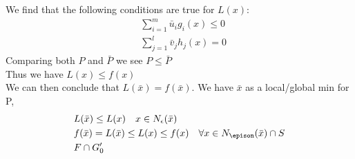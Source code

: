 \documentclass[12pt]{article}
\begin{document}
We find that the following conditions are true for $L(x)$: \\
    \begin{align*}
        &\sum_{i=1}^{m} \bar u_i g_i(x) \leq 0 \\
        &\sum_{j=1}^{l} \bar v_j h_j(x) = 0
    \end{align*}
Comparing both $P$ and $\bar P$ we see $P \leq  \bar P$\\
Thus we have $L(x) \leq f(x)$\\
We can then conclude that $L(\bar x) = f(\bar x)$. We have $\bar x$ as a local/global min for P,\\
    \begin{align*}
        &L(\bar x) \leq L(x) \quad x \in N_\epsilon (\bar x)\\
        &f(\bar x) = L(\bar x) \leq L(x) \leq f(x) \quad \forall x \in N_\epison (\bar x) \cap S\\
        &F \cap G_0'
    \end{align*}
\end{document}
